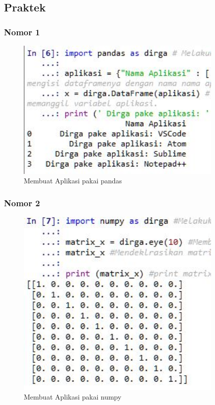 \subsection{Praktek}
\subsubsection{Nomor 1}
\hfill\break

\begin{figure}[H]
\centerline{\includegraphics[width=10cm]{figures/1174066/3/4.jpg}}
\caption{Membuat Aplikasi pakai pandas}
\label{labelgambar}
\end{figure}

\subsubsection{Nomor 2}
\hfill\break

\begin{figure}[H]
\centerline{\includegraphics[width=10cm]{figures/1174066/3/5.jpg}}
\caption{Membuat Aplikasi pakai numpy}
\label{labelgambar}
\end{figure}

